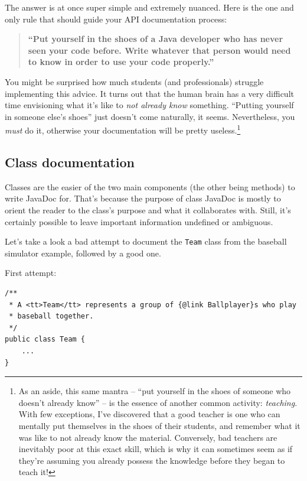 The answer is at once super simple and extremely nuanced. Here is the one and
only rule that should guide your API documentation process:

\begin{samepage}
\begin{quote}

\textbf{\textsf{``Put yourself in the shoes of a Java developer who has never
seen your code before. Write whatever that person would need to know in order
to use your code properly.''}}

\end{quote}
\end{samepage}

You might be surprised how much students (and professionals) struggle
implementing this advice. It turns out that the human brain has a very
difficult time envisioning what it's like to \textit{not already know}
something. ``Putting yourself in someone else's shoes'' just doesn't come
naturally, it seems. Nevertheless, you \textit{must} do it, otherwise your
documentation will be pretty useless.\footnote{As an aside, this same mantra
-- ``put yourself in the shoes of someone who doesn't already know'' -- is the
essence of another common activity: \textit{teaching}. With few exceptions,
I've discovered that a good teacher is one who can mentally put themselves in
the shoes of their students, and remember what it was like to not already know
the material. Conversely, bad teachers are inevitably poor at this exact
skill, which is why it can sometimes seem as if they're assuming you already
possess the knowledge before they began to teach it!}


\subsection{Class documentation}

Classes are the easier of the two main components (the other being methods) to
write JavaDoc for. That's because the purpose of class JavaDoc is mostly to
orient the reader to the class's purpose and what it collaborates with. Still,
it's certainly possible to leave important information undefined or ambiguous.

Let's take a look a bad attempt to document the \texttt{Team} class from the
baseball simulator example, followed by a good one.

First attempt:
\vspace{-.15in}
\begin{Verbatim}[fontsize=\small,samepage=true,frame=single]
/**
 * A <tt>Team</tt> represents a group of {@link Ballplayer}s who play
 * baseball together.
 */
public class Team {
    ...
}
\end{Verbatim}

